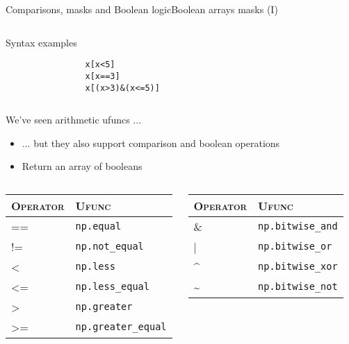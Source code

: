 \documentclass[10pt,compress]{beamer} %
\begin{document}
\begin{frame}[fragile]{Comparisons, masks and Boolean logic}{Boolean arrays masks (I)}
	\begin{columns}
		\begin{exampleblock}{\footnotesize{Syntax examples}}
		\vspace{-0.2cm} 
			\begin{lstlisting}
				x[x<5]
				x[x==3]
				x[(x>3)&(x<=5)]
			\end{lstlisting}
		\vspace{-0.2cm} 
		\end{exampleblock}
	\end{columns}

	\bigskip

	We've seen arithmetic ufuncs ...
	\begin{itemize}
		\item ... but they also support comparison and boolean operations
		\item Return an array of booleans
	\end{itemize}

	\footnotesize{
	\begin{columns}
 	   \column{0.5\textwidth}
       \begin{tabular}{ll}\hline
       	\textsc{Operator} &  \textsc{Ufunc}\\ \hline
       	== & \texttt{np.equal}  \\
       	!= & \texttt{np.not\_equal}  \\
       	<  & \texttt{np.less}  \\
       	<= & \texttt{np.less\_equal}  \\
       	>  & \texttt{np.greater}  \\
       	>= & \texttt{np.greater\_equal}\\\hline
    	\end{tabular}

 	   \column{0.5\textwidth}
        \begin{tabular}{ll}\hline
       	\textsc{Operator} &  \textsc{Ufunc}\\ \hline
       	\& & \texttt{np.bitwise\_and} \\
       	|  & \texttt{np.bitwise\_or}  \\
       	\textasciicircum & \texttt{np.bitwise\_xor} \\
       	\textasciitilde & \texttt{np.bitwise\_not} \\\hline
    	\end{tabular}
	\end{columns}
	}
\end{frame}
\end{document}
